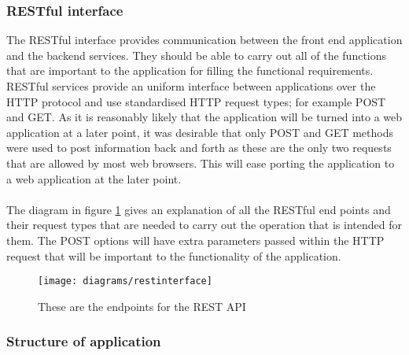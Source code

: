 \subsubsection{RESTful interface}

The RESTful interface provides communication between the front end application and the backend services. They should be able to carry out all of the functions that are important to the application for filling the functional requirements. RESTful services provide an uniform interface between applications over the HTTP protocol and use standardised HTTP request types; for example POST and GET. As it is reasonably likely that the application will be turned into a web application at a later point, it was desirable that only POST and GET methods were used to post information back and forth as these are the only two requests that are allowed by most web browsers. This will ease porting the application to a web application at the later point.\\
\\
The diagram in figure \ref{fig:rest_pai_diagram_image} gives an explanation of all the RESTful end points and their request types that are needed to carry out the operation that is intended for them. The POST options will have extra parameters passed within the HTTP request that will be important to the functionality of the application. 

\begin{figure}[H]
    \centering
    \texttt{[image: diagrams/restinterface]}
    \caption{These are the endpoints for the REST API}
    \label{fig:rest_pai_diagram_image}
\end{figure} 

\subsubsection{Structure of application}

